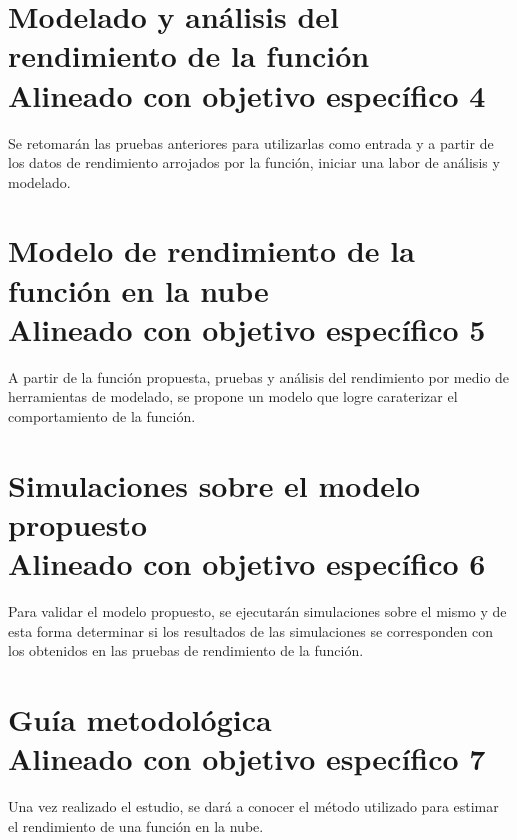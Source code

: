 \section[Modelado y análisis del rendimiento de la función]{Modelado y análisis del rendimiento de la función\\\small{Alineado con objetivo específico 4}}
Se retomarán las pruebas anteriores para utilizarlas como entrada y a partir de los datos de rendimiento arrojados por la función, iniciar una labor de análisis y modelado.

\section[Modelo de rendimiento de la función en la nube]{Modelo de rendimiento de la función en la nube\\\small{Alineado con objetivo específico 5}}
A partir de la función propuesta, pruebas y análisis del rendimiento por medio de herramientas de modelado, se propone un modelo que logre caraterizar el comportamiento de la función.

\section[Simulaciones sobre el modelo propuesto]{Simulaciones sobre el modelo propuesto\\\small{Alineado con objetivo específico 6}}
Para validar el modelo propuesto, se ejecutarán simulaciones sobre el mismo y de esta forma determinar si los resultados de las simulaciones se corresponden con los obtenidos en las pruebas de rendimiento de la función.

\section[Guía metodológica]{Guía metodológica\\\small{Alineado con objetivo específico 7}}
Una vez realizado el estudio, se dará a conocer el método utilizado para estimar el rendimiento de una función en la nube. 